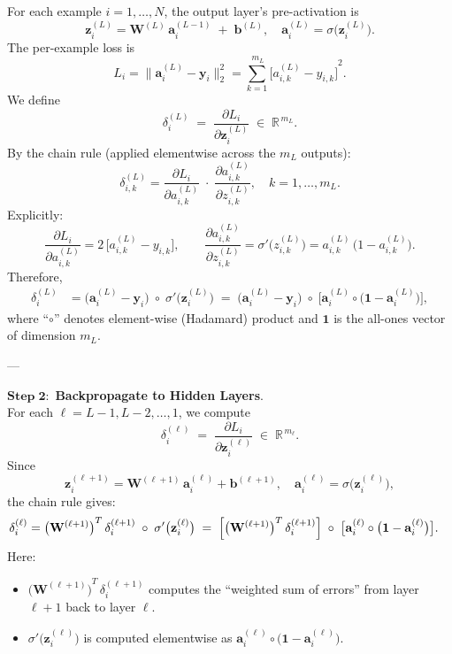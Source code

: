 \documentclass{article}
\begin{document}
For each example \(i=1,\dots,N\), the output layer's pre-activation is
\[
    \mathbf{z}_{i}^{(L)} 
    = \mathbf{W}^{(L)}\,\mathbf{a}_{i}^{(L-1)} \;+\; \mathbf{b}^{(L)},
    \quad
    \mathbf{a}_{i}^{(L)} 
    = \sigma\bigl(\mathbf{z}_{i}^{(L)}\bigr).
\]
The per-example loss is
\[
    L_{i} 
    = \bigl\|\mathbf{a}_{i}^{(L)} - \mathbf{y}_{i}\bigr\|_{2}^{2} 
    = \sum_{k=1}^{\,m_{L}} {\bigl[a_{i,k}^{(L)} - y_{i,k}\bigr]}^{2}.
\]
We define
\[
    \delta_{i}^{(L)}
    \;=\; \frac{\partial L_{i}}{\partial \mathbf{z}_{i}^{(L)}} 
    \;\in\; \mathbb{R}^{\,m_{L}}.
\]
By the chain rule (applied elementwise across the \(m_{L}\) outputs):
\[
    \delta_{i,k}^{(L)} 
    = \frac{\partial L_{i}}{\partial a_{i,k}^{(L)}} 
      \;\cdot\; \frac{\partial a_{i,k}^{(L)}}{\partial z_{i,k}^{(L)}}, 
    \quad k=1,\dots,m_{L}.
\]
Explicitly:
\[
    \frac{\partial L_{i}}{\partial a_{i,k}^{(L)}} 
    = 2\,\bigl[a_{i,k}^{(L)} - y_{i,k}\bigr], 
    \qquad
    \frac{\partial a_{i,k}^{(L)}}{\partial z_{i,k}^{(L)}} 
    = \sigma'\bigl(z_{i,k}^{(L)}\bigr) 
    = a_{i,k}^{(L)}\,\bigl(1 - a_{i,k}^{(L)}\bigr).
\]
Therefore,
\begin{align}
    \delta_{i}^{(L)} 
    &= \bigl(\mathbf{a}_{i}^{(L)} - \mathbf{y}_{i}\bigr)\;\circ\;\sigma'\bigl(\mathbf{z}_{i}^{(L)}\bigr)
    \;=\; \bigl(\mathbf{a}_{i}^{(L)} - \mathbf{y}_{i}\bigr)\;\circ\;\bigl[\mathbf{a}_{i}^{(L)}\circ\bigl(\mathbf{1} - \mathbf{a}_{i}^{(L)}\bigr)\bigr],
    \label{eq:delta-L}
\end{align}
where “\(\circ\)” denotes element-wise (Hadamard) product and \(\mathbf{1}\) is the all-ones vector of dimension \(m_{L}\).

---

\noindent\(\mathbf{Step\;2:}\) \textbf{Backpropagate to Hidden Layers}.\\
For each \(\ell = L-1,L-2,\dots,1\), we compute
\[
    \delta_{i}^{(\ell)}
    \;=\; \frac{\partial L_{i}}{\partial \mathbf{z}_{i}^{(\ell)}} 
    \;\in\;\mathbb{R}^{\,m_{\ell}}.
\]
Since
\[
    \mathbf{z}_{i}^{(\ell+1)} 
    = \mathbf{W}^{(\ell+1)}\,\mathbf{a}_{i}^{(\ell)} + \mathbf{b}^{(\ell+1)},
    \quad
    \mathbf{a}_{i}^{(\ell)} = \sigma\bigl(\mathbf{z}_{i}^{(\ell)}\bigr),
\]
the chain rule gives:
\begin{align}
    \delta_{i}^{(\ell)} 
    &= {\bigl(\mathbf{W}^{(\ell+1)}\bigr)}^{T} \,\delta_{i}^{(\ell+1)} 
       \;\circ\; \sigma'\bigl(\mathbf{z}_{i}^{(\ell)}\bigr)
    \;=\;\Bigl[{\bigl(\mathbf{W}^{(\ell+1)}\bigr)}^{T} \,\delta_{i}^{(\ell+1)}\Bigr]
           \;\circ\; \bigl[\mathbf{a}_{i}^{(\ell)} \circ\bigl(\mathbf{1} - \mathbf{a}_{i}^{(\ell)}\bigr)\bigr].
    \label{eq:delta-hidden-vector}
\end{align}
Here:
\begin{itemize}
    \item \({\bigl(\mathbf{W}^{(\ell+1)}\bigr)}^{T}\,\delta_{i}^{(\ell+1)}\) 
          computes the “weighted sum of errors” from layer \(\ell+1\) back to layer \(\ell\).  
    \item \(\sigma'\bigl(\mathbf{z}_{i}^{(\ell)}\bigr)\) is computed elementwise as 
          \(\mathbf{a}_{i}^{(\ell)} \circ\bigl(\mathbf{1} - \mathbf{a}_{i}^{(\ell)}\bigr)\).  
\end{itemize}
\end{document}
